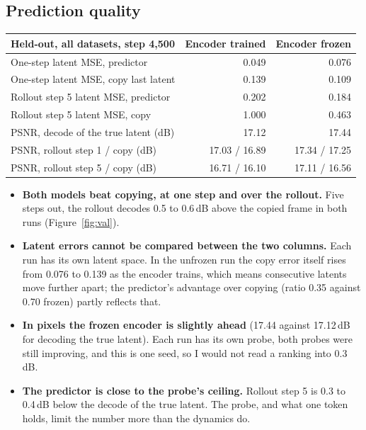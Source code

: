 \documentclass[10pt]{article}
\begin{document}
\subsection{Prediction quality}
\begin{center}\small
\begin{tabular}{@{}lrr@{}}
\toprule
Held-out, all datasets, step 4{,}500 & Encoder trained & Encoder frozen \\
\midrule
One-step latent MSE, predictor & 0.049 & 0.076 \\
One-step latent MSE, copy last latent & 0.139 & 0.109 \\
Rollout step 5 latent MSE, predictor & 0.202 & 0.184 \\
Rollout step 5 latent MSE, copy & 1.000 & 0.463 \\
\midrule
PSNR, decode of the true latent (dB) & 17.12 & 17.44 \\
PSNR, rollout step 1 / copy (dB) & 17.03 / 16.89 & 17.34 / 17.25 \\
PSNR, rollout step 5 / copy (dB) & 16.71 / 16.10 & 17.11 / 16.56 \\
\bottomrule
\end{tabular}
\end{center}

\begin{itemize}
\item \textbf{Both models beat copying, at one step and over the rollout.} Five steps out,
  the rollout decodes 0.5 to 0.6\,dB above the copied frame in both runs
  (Figure~\ref{fig:val}).
\item \textbf{Latent errors cannot be compared between the two columns.} Each run has its own
  latent space. In the unfrozen run the copy error itself rises from 0.076 to 0.139 as the
  encoder trains, which means consecutive latents move further apart; the predictor's
  advantage over copying (ratio 0.35 against 0.70 frozen) partly reflects that.
\item \textbf{In pixels the frozen encoder is slightly ahead} (17.44 against
  17.12\,dB for decoding the true latent). Each run has its own probe, both probes were
  still improving, and this is one seed, so I would not read a ranking into 0.3\,dB.
\item \textbf{The predictor is close to the probe's ceiling.} Rollout step 5 is 0.3 to 0.4\,dB
  below the decode of the true latent. The probe, and what one token holds, limit the
  number more than the dynamics do.
\end{itemize}
\end{document}
